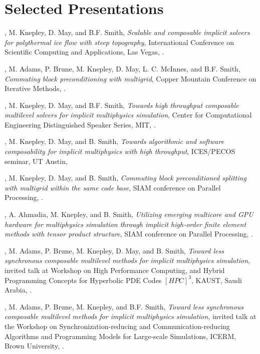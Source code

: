 \documentclass[10pt,letterpaper]{article}
\newcommand\ptitle[1]{\textit{#1}} %
\renewenvironment{itemize}{
  \begin{list}{}{
    \setlength{\leftmargin}{1.5em}
    \setlength{\itemsep}{0.25em}
    \setlength{\parskip}{0pt}
    \setlength{\parsep}{0.25em}
  }
}{
  \end{list}
}
\begin{document}
\section*{Selected Presentations}
\begin{itemize}
\item {\JedBrown}, M. Knepley, D. May, and B.F. Smith, \ptitle{Scalable and composable implicit solvers for polythermal ice flow with steep topography}, International Conference on Scientific Computing and Applications, Las Vegas, .
\item {\JedBrown}, M. Adams, P. Brune, M. Knepley, D. May, L. C. McInnes, and B.F. Smith, \ptitle{Commuting block preconditioning with multigrid}, Copper Mountain Conference on Iterative Methods, .
\item {\JedBrown}, M. Knepley, D. May, and B.F. Smith, \ptitle{Towards high throughput composable multilevel solvers for implicit multiphysics simulation}, Center for Computational Engineering Distinguished Speaker Series, MIT, .
\item {\JedBrown}, M. Knepley, D. May, and B. Smith, \ptitle{Towards algorithmic and software composability for implicit multiphysics with high throughput}, ICES/PECOS seminar, UT Austin, 
\item {\JedBrown}, M. Knepley, D. May, and B. Smith, \ptitle{Commuting block preconditioned splitting with multigrid within the same code base}, SIAM conference on Parallel Processing, .
\item {\JedBrown}, A. Ahmadia, M. Knepley, and B. Smith, \ptitle{Utilizing emerging multicore and GPU hardware for multiphysics simulation through implicit high-order finite element methods with tensor product structure}, SIAM conference on Parallel Processing, .
\item {\JedBrown}, M. Adams, P. Brune, M. Knepley, D. May, and B. Smith, \ptitle{Toward less synchronous composable multilevel methods for implicit multiphysics simulation}, invited talk at Workshop on High Performance Computing, and Hybrid Programming Concepts for Hyperbolic PDE Codes $[HPC]^3$, KAUST, Saudi Arabia, .
\item {\JedBrown}, M. Adams, P. Brune, M. Knepley, and B.F. Smith, \ptitle{Toward less synchronous composable multilevel methods for implicit multiphysics simulation}, invited talk at the Workshop on Synchronization-reducing and Communication-reducing Algorithms and Programming Models for Large-scale Simulations, ICERM, Brown University, .

\end{itemize}
\end{document}
